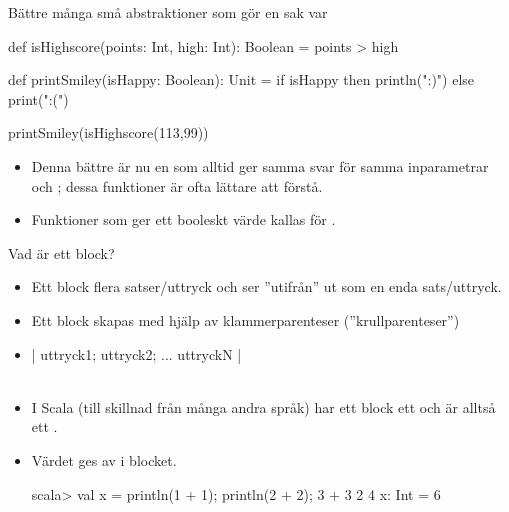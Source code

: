 \begin{Slide}{Bättre många små abstraktioner som gör en sak var}

\begin{Code}[basicstyle=\ttfamily\fontsize{8}{11}\selectfont]
def isHighscore(points: Int, high: Int): Boolean = points > high

def printSmiley(isHappy: Boolean): Unit =
  if isHappy then println(":)") else print(":(")
\end{Code}

\pause\vspace{1em}
\begin{REPLnonum}
  printSmiley(isHighscore(113,99))
\end{REPLnonum}

\pause
\begin{itemize}
  \item Denna bättre  är nu en  som alltid ger samma svar för samma inparametrar och ; dessa funktioner är ofta lättare att förstå.
  \item Funktioner som ger ett booleskt värde kallas för .
\end{itemize}

\end{Slide}



\begin{Slide}{Vad är ett block?}

\begin{itemize}
\item Ett block  flera satser/uttryck och ser ''utifrån'' ut som en enda sats/uttryck.

\item Ett block skapas med hjälp av klammerparenteser (''krullparenteser'')

\item [] {\fontsize{14}{18}\selectfont \code|{ uttryck1; uttryck2; ... uttryckN }|}\\~

\pause

\item I Scala (till skillnad från många andra språk) har ett block ett  och är alltså ett .

\item Värdet ges av  i blocket.

\begin{REPLnonum}
scala> val x = { println(1 + 1); println(2 + 2); 3 + 3 }
2
4
x: Int = 6
\end{REPLnonum}


\end{itemize}

\end{Slide}

